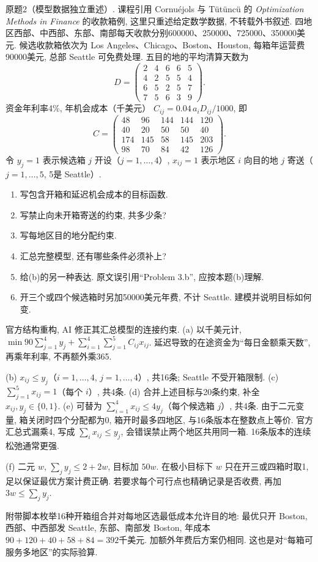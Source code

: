 \begin{exercise}\label{ass:15053-practice-q2}
原题2（模型数据独立重述）. 课程引用 Cornu\'{e}jols 与 T\"ut\"unc\"u 的 \emph{Optimization Methods in Finance} 的收款箱例, 这里只重述给定数学数据, 不转载外书叙述. 四地区西部、中西部、东部、南部每天收款分别600000、250000、725000、350000美元. 候选收款箱依次为 Los Angeles、Chicago、Boston、Houston, 每箱年运营费90000美元, 总部 Seattle 可免费处理. 五目的地的平均清算天数为
\[
D=\begin{pmatrix}2&4&6&6&5\\4&2&5&5&4\\6&5&2&5&7\\7&5&6&3&9\end{pmatrix}.
\]
资金年利率4\%, 年机会成本（千美元） $C_{ij}=0.04\,a_iD_{ij}/1000$, 即
\[
C=\begin{pmatrix}48&96&144&144&120\\40&20&50&50&40\\174&145&58&145&203\\98&70&84&42&126\end{pmatrix}.
\]
令 $y_j=1$ 表示候选箱 $j$ 开设（$j=1,\ldots,4$）, $x_{ij}=1$ 表示地区 $i$ 向目的地 $j$ 寄送（$j=1,\ldots,5$, 5是 Seattle）.
\begin{enumerate}[label=(\alph*)]
\item 写包含开箱和延迟机会成本的目标函数.
\item 写禁止向未开箱寄送的约束, 共多少条?
\item 写每地区目的地分配约束.
\item 汇总完整模型, 还有哪些条件必须补上?
\item 给(b)的另一种表达. 原文误引用“Problem 3.b”, 应按本题(b)理解.
\item 开三个或四个候选箱时另加50000美元年费, 不计 Seattle. 建模并说明目标如何变.
\end{enumerate}
\end{exercise}
\begin{solution}
官方结构重构, AI 修正其汇总模型的连接约束. (a) 以千美元计, $\min90\sum_{j=1}^4y_j+\sum_{i=1}^4\sum_{j=1}^5C_{ij}x_{ij}$. 延迟导致的在途资金为“每日金额乘天数”, 再乘年利率, 不再额外乘365.

(b) $x_{ij}\le y_j$（$i=1,\ldots,4$, $j=1,\ldots,4$）, 共16条; Seattle 不受开箱限制. (c) $\sum_{j=1}^5x_{ij}=1$（每个 $i$）, 共4条. (d) 合并上述目标与20条约束, 补全 $x_{ij},y_j\in\{0,1\}$. (e) 可替为 $\sum_{i=1}^4x_{ij}\le4y_j$（每个候选箱 $j$）, 共4条. 由于二元变量, 箱关闭时四个分配都为0, 箱开时最多四地区, 与16条版本在整数点上等价. 官方汇总式漏乘4, 写成 $\sum_i x_{ij}\le y_j$, 会错误禁止两个地区共用同一箱. 16条版本的连续松弛通常更强.

(f) 二元 $w$, $\sum_jy_j\le2+2w$, 目标加 $50w$. 在极小目标下 $w$ 只在开三或四箱时取1, 足以保证最优方案计费正确. 若要求每个可行点也精确记录是否收费, 再加 $3w\le\sum_jy_j$.

附带脚本枚举16种开箱组合并对每地区选最低成本允许目的地: 最优只开 Boston, 西部、中西部发 Seattle, 东部、南部发 Boston, 年成本 $90+120+40+58+84=392$千美元. 加额外年费后方案仍相同. 这也是对“每箱可服务多地区”的实际验算.
\end{solution}

